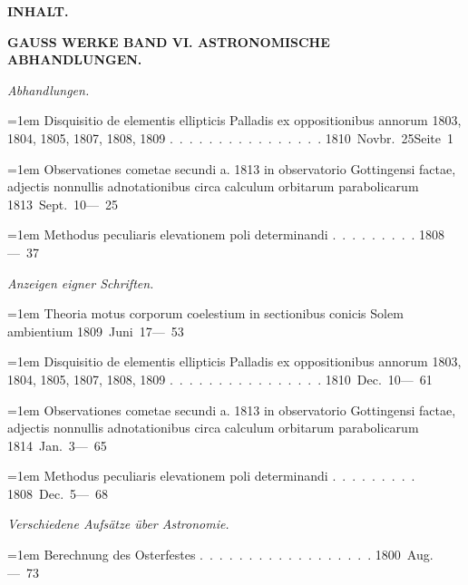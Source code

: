 \clearpage
{}
\begingroup
\raggedright
\begin{center}\textbf{INHALT.}\par\medskip
\textbf{GAUSS WERKE BAND VI. ASTRONOMISCHE ABHANDLUNGEN.}\end{center}
\par\medskip
\noindent\textit{Abhandlungen.}\par\smallskip\nopagebreak[4]
\noindent\hangindent=1em Disquisitio de elementis ellipticis Palladis ex oppositionibus annorum 1803, 1804, 1805, 1807, 1808, 1809 \mbox{.\ .\ .\ .\ .\ .\ .\ .\ .\ .\ .\ .\ .\ .\ .\ .} \hfill\mbox{1810 Novbr. 25}\quad\mbox{Seite 1}\par\smallskip
\noindent\hangindent=1em Observationes cometae secundi a. 1813 in observatorio Gottingensi factae, adjectis nonnullis adnotationibus circa calculum orbitarum parabolicarum \hfill\mbox{1813 Sept. 10}\quad\mbox{--- 25}\par\smallskip
\noindent\hangindent=1em Methodus peculiaris elevationem poli determinandi \mbox{.\ .\ .\ .\ .\ .\ .\ .\ .} \hfill\mbox{1808}\quad\mbox{--- 37}\par\smallskip
\par\medskip
\noindent\textit{Anzeigen eigner Schriften.}\par\smallskip\nopagebreak[4]
\noindent\hangindent=1em Theoria motus corporum coelestium in sectionibus conicis Solem ambientium \hfill\mbox{1809 Juni 17}\quad\mbox{--- 53}\par\smallskip
\noindent\hangindent=1em Disquisitio de elementis ellipticis Palladis ex oppositionibus annorum 1803, 1804, 1805, 1807, 1808, 1809 \mbox{.\ .\ .\ .\ .\ .\ .\ .\ .\ .\ .\ .\ .\ .\ .\ .} \hfill\mbox{1810 Dec. 10}\quad\mbox{--- 61}\par\smallskip
\noindent\hangindent=1em Observationes cometae secundi a. 1813 in observatorio Gottingensi factae, adjectis nonnullis adnotationibus circa calculum orbitarum parabolicarum \hfill\mbox{1814 Jan. 3}\quad\mbox{--- 65}\par\smallskip
\noindent\hangindent=1em Methodus peculiaris elevationem poli determinandi \mbox{.\ .\ .\ .\ .\ .\ .\ .\ .} \hfill\mbox{1808 Dec. 5}\quad\mbox{--- 68}\par\smallskip
\par\medskip
\noindent\textit{Verschiedene Aufsätze über Astronomie.}\par\smallskip\nopagebreak[4]
\noindent\hangindent=1em Berechnung des Osterfestes \mbox{.\ .\ .\ .\ .\ .\ .\ .\ .\ .\ .\ .\ .\ .\ .\ .\ .\ .} \hfill\mbox{1800 Aug.}\quad\mbox{--- 73}\par\smallskip
